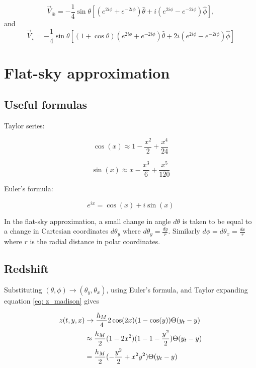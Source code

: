\documentclass{article}
\begin{document}
\begin{equation}
    \vec{V}_\oplus = -\frac{1}{4}\sin\theta \left[(e^{2i\phi} + e^{-2i\phi})\hat{\theta} + i(e^{2i\phi} - e^{-2i\phi})\hat{\phi}\right], 
    \label{eq: V_earth_madison}
\end{equation}
and 
\begin{equation}
    \vec{V}_\star = -\frac{1}{4}\sin\theta \left[(1+\cos\theta)(e^{2i\phi} + e^{-2i\phi})\hat{\theta} + 2i(e^{2i\phi} - e^{-2i\phi})\hat{\phi}\right]
    \label{eq: V_star_madison}
\end{equation}

\section{Flat-sky approximation}

\subsection{Useful formulas}
Taylor series:

\begin{equation*}
    \cos(x) \approx 1 - \frac{x^2}{2} + \frac{x^4}{24}
\end{equation*}

\begin{equation*}
    \sin(x) \approx x - \frac{x^3}{6} + \frac{x^5}{120}
\end{equation*}

Euler's formula:

\begin{equation*}
    e^{ix} = \cos(x) + i\sin(x) 
\end{equation*}

In the flat-sky approximation, a small change in angle $d\theta$ is taken to be equal to a change in Cartesian coordinates $d\theta_y$ where $d\theta_y = \frac{dy}{r}$. Similarly $d\phi = d\theta_x = \frac{dx}{r}$ where $r$ is the radial distance in polar coordinates.
\\

\subsection{Redshift}
Substituting $(\theta, \phi) \rightarrow (\theta_y, \theta_x)$, using Euler's formula, and Taylor expanding equation \ref{eq: z_madison} gives

\begin{align}
    z(t,y,x) &\rightarrow \frac{h_M}{4} 2\cos(2x)(1-\cos(y))\Theta(y_t - y) \notag \\
    &\approx \frac{h_M}{2}(1-2x^2)(1-1-\frac{y^2}{2})\Theta(y_t - y) \notag \\ 
    &= \frac{h_M}{2}(-\frac{y^2}{2} + x^2y^2)\Theta(y_t - y) \label{eq:z_flatsky}
\end{align}
\end{document}
